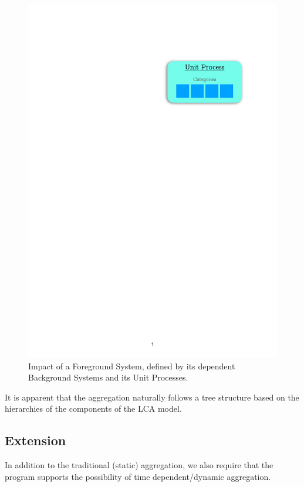 \begin{figure}[H]
    \centering
    \includegraphics[page=3, width=1\linewidth]{.Figures/ImpactAggregation.pdf}
    \caption{Impact of a Foreground System, defined by its dependent Background Systems and its Unit Processes.}
    \label{fig:ForegroundSystem-Aggregation}
\end{figure}

It is apparent that the aggregation naturally follows a tree structure based on the hierarchies of the components of the LCA model.

\subsection{Extension}

In addition to the traditional (static) aggregation, we also require that the program supports the possibility of time dependent/dynamic aggregation.

